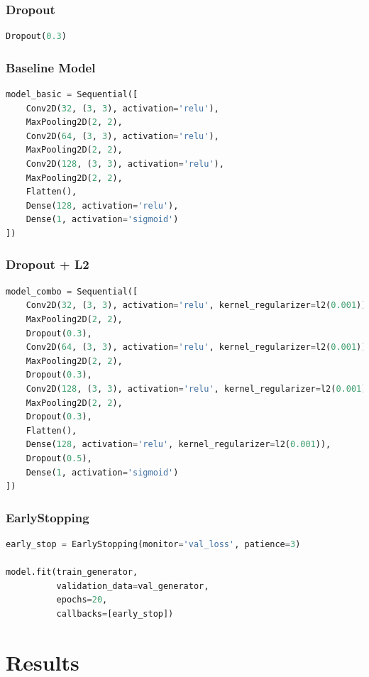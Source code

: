\documentclass{article}
\begin{document}
\subsubsection*{Dropout}
\begin{lstlisting}[language=Python]
Dropout(0.3)
\end{lstlisting}

\subsubsection*{Baseline Model}
\begin{lstlisting}[language=Python]
model_basic = Sequential([
    Conv2D(32, (3, 3), activation='relu'),
    MaxPooling2D(2, 2),
    Conv2D(64, (3, 3), activation='relu'),
    MaxPooling2D(2, 2),
    Conv2D(128, (3, 3), activation='relu'),
    MaxPooling2D(2, 2),
    Flatten(),
    Dense(128, activation='relu'),
    Dense(1, activation='sigmoid')
])
\end{lstlisting}

\subsubsection*{Dropout + L2}
\begin{lstlisting}[language=Python]
model_combo = Sequential([
    Conv2D(32, (3, 3), activation='relu', kernel_regularizer=l2(0.001)),
    MaxPooling2D(2, 2),
    Dropout(0.3),
    Conv2D(64, (3, 3), activation='relu', kernel_regularizer=l2(0.001)),
    MaxPooling2D(2, 2),
    Dropout(0.3),
    Conv2D(128, (3, 3), activation='relu', kernel_regularizer=l2(0.001)),
    MaxPooling2D(2, 2),
    Dropout(0.3),
    Flatten(),
    Dense(128, activation='relu', kernel_regularizer=l2(0.001)),
    Dropout(0.5),
    Dense(1, activation='sigmoid')
])
\end{lstlisting}

\subsubsection*{EarlyStopping}
\begin{lstlisting}[language=Python]
early_stop = EarlyStopping(monitor='val_loss', patience=3)

model.fit(train_generator,
          validation_data=val_generator,
          epochs=20,
          callbacks=[early_stop])
\end{lstlisting}

\section{Results}
\end{document}
